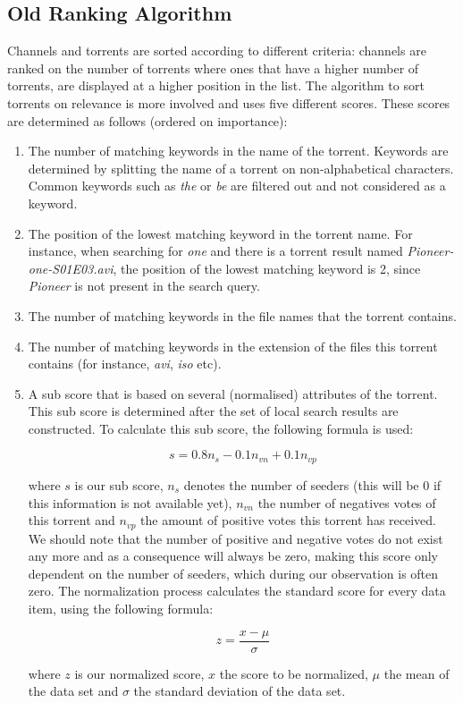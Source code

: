 \subsection{Old Ranking Algorithm}
Channels and torrents are sorted according to different criteria: channels are ranked on the number of torrents where ones that have a higher number of torrents, are displayed at a higher position in the list. The algorithm to sort torrents on relevance is more involved and uses five different scores. These scores are determined as follows (ordered on importance):
\begin{enumerate}
	\item The number of matching keywords in the name of the torrent. Keywords are determined by splitting the name of a torrent on non-alphabetical characters. Common keywords such as \emph{the} or \emph{be} are filtered out and not considered as a keyword.
	\item The position of the lowest matching keyword in the torrent name. For instance, when searching for \emph{one} and there is a torrent result named \emph{Pioneer-one-S01E03.avi}, the position of the lowest matching keyword is 2, since \emph{Pioneer} is not present in the search query.
	\item The number of matching keywords in the file names that the torrent contains.
	\item The number of matching keywords in the extension of the files this torrent contains (for instance, \emph{avi}, \emph{iso} etc).
	\item A sub score that is based on several (normalised) attributes of the torrent. This sub score is determined after the set of local search results are constructed. To calculate this sub score, the following formula is used: 
	
	\begin{equation}
	\label{eq:score-old-ranking-5}
	s = 0.8n_s - 0.1n_{vn} + 0.1n_{vp}
	\end{equation}
	
	 where $ s $ is our sub score, $ n_s $ denotes the number of seeders (this will be 0 if this information is not available yet), $ n_{vn} $ the number of negatives votes of this torrent and $ n_{vp} $ the amount of positive votes this torrent has received. We should note that the number of positive and negative votes do not exist any more and as a consequence will always be zero, making this score only dependent on the number of seeders, which during our observation is often zero. The normalization process calculates the standard score for every data item, using the following formula:
	
	\begin{equation}
	\label{eq:normalization-standard-score}
	z = \frac{x - \mu}{\sigma}
	\end{equation}
	
	where $ z $ is our normalized score, $ x $ the score to be normalized, $ \mu $ the mean of the data set and $ \sigma $ the standard deviation of the data set.
	
\end{enumerate}
